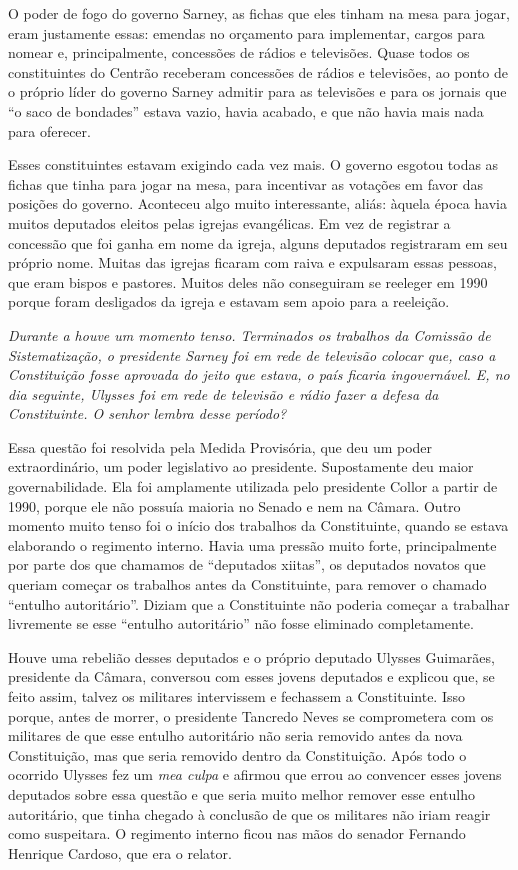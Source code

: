 O poder de fogo do governo Sarney, as fichas que
eles tinham na mesa para jogar, eram justamente essas: emendas no
orçamento para implementar, cargos para nomear e, principalmente,
concessões de rádios e televisões. Quase todos os constituintes do
Centrão receberam concessões de rádios e televisões, ao ponto de o
próprio líder do governo Sarney admitir para as televisões e para os
jornais que ``o saco de bondades'' estava vazio, havia acabado, e que
não havia mais nada para oferecer.

Esses constituintes estavam exigindo cada vez mais. O governo esgotou
todas as fichas que tinha para jogar na mesa, para incentivar as
votações em favor das posições do governo. Aconteceu algo muito
interessante, aliás: àquela época havia muitos deputados eleitos pelas
igrejas evangélicas. Em vez de registrar a concessão que foi ganha em
nome da igreja, alguns deputados registraram em seu próprio nome. Muitas
das igrejas ficaram com raiva e expulsaram essas pessoas, que eram
bispos e pastores. Muitos deles não conseguiram se reeleger em 1990
porque foram desligados da igreja e estavam sem apoio para a reeleição.

\medskip

\noindent\emph{Durante a  houve um momento tenso. Terminados os trabalhos da
Comissão de Sistematização, o presidente Sarney foi em rede de televisão
colocar que, caso a Constituição fosse aprovada do jeito que estava, o
país ficaria ingovernável. E, no dia seguinte, Ulysses foi em rede de
televisão e rádio fazer a defesa da Constituinte. O senhor lembra desse
período?}

Essa questão foi resolvida pela Medida Provisória,
que deu um poder extraordinário, um poder legislativo ao presidente.
Supostamente deu maior governabilidade. Ela foi amplamente utilizada
pelo presidente Collor a partir de 1990, porque ele não possuía maioria
no Senado e nem na Câmara. Outro momento muito tenso foi o início dos
trabalhos da Constituinte, quando se estava elaborando o regimento
interno. Havia uma pressão muito forte, principalmente por parte dos que
chamamos de ``deputados xiitas'', os deputados novatos que queriam
começar os trabalhos antes da Constituinte, para remover o chamado
``entulho autoritário''. Diziam que a Constituinte não poderia começar a
trabalhar livremente se esse ``entulho autoritário'' não fosse eliminado
completamente.

Houve uma rebelião desses deputados e o próprio deputado Ulysses
Guimarães, presidente da Câmara, conversou com esses jovens deputados e
explicou que, se feito assim, talvez os militares intervissem e
fechassem a Constituinte. Isso porque, antes de morrer, o presidente
Tancredo Neves se comprometera com os militares de que esse entulho
autoritário não seria removido antes da nova Constituição, mas que seria
removido dentro da Constituição. Após todo o ocorrido Ulysses fez um \emph{mea
culpa} e afirmou que errou ao convencer esses jovens deputados sobre essa
questão e que seria muito melhor remover esse entulho autoritário, que
tinha chegado à conclusão de que os militares não iriam reagir como
suspeitara. O regimento interno ficou nas mãos do senador Fernando
Henrique Cardoso, que era o relator.

